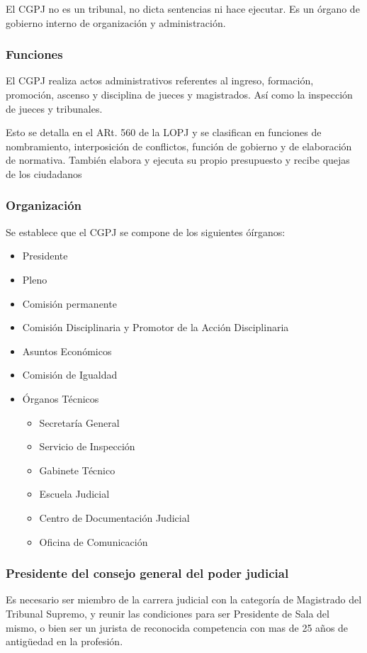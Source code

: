     El CGPJ no es un tribunal, no dicta sentencias ni hace ejecutar. Es un órgano de gobierno interno de organización y administración.

    \subsubsection{Funciones} %
        El CGPJ realiza actos administrativos referentes al ingreso, formación, promoción, ascenso y disciplina de jueces y magistrados. Así como la inspección de jueces y tribunales.

        Esto se detalla en el ARt. 560 de la LOPJ y se clasifican en funciones de nombramiento, interposición de conflictos, función de gobierno y de elaboración de normativa. También elabora y ejecuta su propio presupuesto y recibe quejas de los ciudadanos

    \subsubsection{Organización} %
        Se establece que el CGPJ se compone de los siguientes óírganos:
        \begin{itemize}
            \item Presidente
            \item Pleno
            \item Comisión permanente
            \item Comisión Disciplinaria y Promotor de la Acción Disciplinaria
            \item Asuntos Económicos
            \item Comisión de Igualdad
            \item Órganos Técnicos
            \begin{itemize}
                \item Secretaría General
                \item Servicio de Inspección
                \item Gabinete Técnico
                \item Escuela Judicial
                \item Centro de Documentación Judicial
                \item Oficina de Comunicación
            \end{itemize}
        \end{itemize}

    \subsubsection{Presidente del consejo general del poder judicial} %
        Es necesario ser miembro de la carrera judicial con la categoría de Magistrado del Tribunal Supremo, y reunir las condiciones para ser Presidente de Sala del mismo, o bien ser un jurista de reconocida competencia con mas de 25 años de antigüedad en la profesión.


